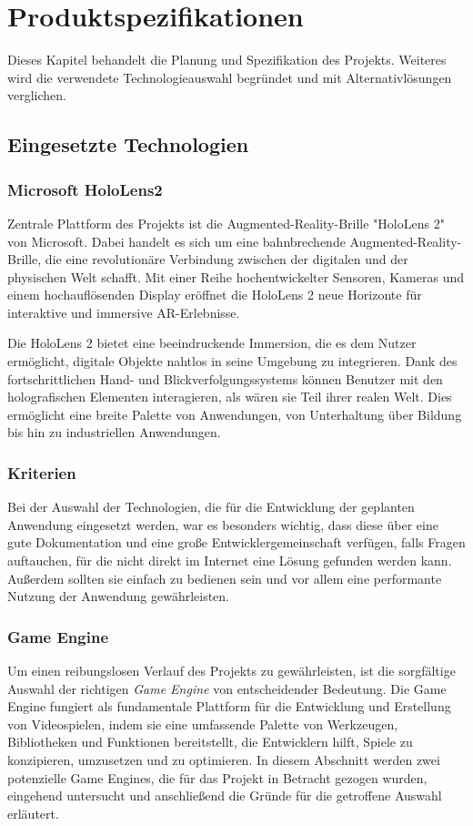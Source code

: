 \chapter{Produktspezifikationen}
Dieses Kapitel behandelt die Planung und Spezifikation des Projekts.
Weiteres wird die verwendete Technologieauswahl begründet und mit Alternativlösungen verglichen.

\section{Eingesetzte Technologien}

\subsection{Microsoft HoloLens2}
Zentrale Plattform des Projekts ist die Augmented-Reality-Brille "HoloLens 2" von Microsoft. Dabei handelt es sich um
eine bahnbrechende Augmented-Reality-Brille, die eine revolutionäre Verbindung zwischen der digitalen und der physischen
Welt schafft. Mit einer Reihe hochentwickelter Sensoren, Kameras und einem hochauflösenden Display eröffnet die HoloLens
2 neue Horizonte für interaktive und immersive AR-Erlebnisse.

Die HoloLens 2 bietet eine beeindruckende Immersion, die es dem Nutzer ermöglicht, digitale Objekte nahtlos in seine
Umgebung zu integrieren. Dank des fortschrittlichen Hand- und Blickverfolgungssystems können Benutzer mit den holografischen
Elementen interagieren, als wären sie Teil ihrer realen Welt. Dies ermöglicht eine breite Palette von Anwendungen, von
Unterhaltung über Bildung bis hin zu industriellen Anwendungen.

\subsection{Kriterien}
Bei der Auswahl der Technologien, die für die Entwicklung der geplanten Anwendung eingesetzt werden, war es besonders
wichtig, dass diese über eine gute Dokumentation und eine große Entwicklergemeinschaft verfügen, falls Fragen auftauchen,
für die nicht direkt im Internet eine Lösung gefunden werden kann. Außerdem sollten sie einfach zu bedienen sein und vor
allem eine performante Nutzung der Anwendung gewährleisten.

\subsection{Game Engine}
Um einen reibungslosen Verlauf des Projekts zu gewährleisten, ist die sorgfältige Auswahl der richtigen \textit{Game Engine} von
entscheidender Bedeutung. Die Game Engine fungiert als fundamentale Plattform für die Entwicklung und Erstellung von
Videospielen, indem sie eine umfassende Palette von Werkzeugen, Bibliotheken und Funktionen bereitstellt, die Entwicklern
hilft, Spiele zu konzipieren, umzusetzen und zu optimieren. In diesem Abschnitt werden zwei potenzielle Game Engines,
die für das Projekt in Betracht gezogen wurden, eingehend untersucht und anschließend die Gründe für die getroffene Auswahl
erläutert.

